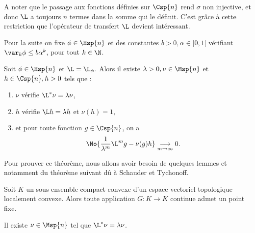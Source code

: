   \begin{remark}
    A noter que le passage aux fonctions définies sur $\Csp{n}$ rend $\sigma$ non injective, et donc $\L$ a toujours $n$ termes dans la somme
    qui le définit. C'est grâce à cette restriction que l'opérateur de transfert $\L$ devient intéressant.
  \end{remark}

  Pour la suite on fixe $\phi \in \Hsp{n}$ et des constantes $b > 0, \alpha \in ]0, 1[$ vérifiant $\var_k\phi \leq b\alpha^k$, pour tout $k \in \N$.

  \begin{theorem}
    \label{thm:rpf}
    \leanok
    Soit $\phi \in \Hsp{n}$ et $\L = \L_{\phi}$. Alors il existe $\lambda > 0, \nu \in \Msp{n}$ et $h \in \Csp{n}, h > 0$ tels que :
    \begin{enumerate}
      \item $\nu$ vérifie $\L^*\nu = \lambda\nu$,
      \item $h$ vérifie $\L h = \lambda h$ et $\nu(h) = 1$,
      \item et pour toute fonction $g \in \Csp{n}$, on a
	$$\No{\frac 1 {\lambda^m} \L^mg - \nu(g)h} \underset{m\to\infty}{\longrightarrow} 0.$$
    \end{enumerate}
  \end{theorem}

  Pour prouver ce théorème, nous allons avoir besoin de quelques lemmes et notamment du théorème suivant dû à Schauder et Tychonoff.

  \begin{theorem}
    \label{thm:schauder}
    \leanok

    Soit $K$ un sous-ensemble compact convexe d'un espace vectoriel topologique localement convexe.
    Alors toute application $G \colon K \longrightarrow K$ continue admet un point fixe.
  \end{theorem}

  \begin{proposition}
    \label{prop:rpf_1}
    \leanok
    Il existe $\nu \in \Msp{n}$ tel que $\L^*\nu = \lambda\nu$.
  \end{proposition}

